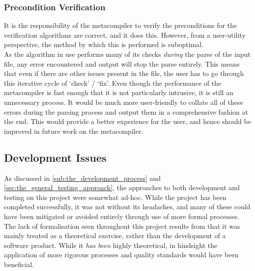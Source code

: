 
\subsubsection{Precondition Verification} %
\label{ssub:precondition_verification}
It is the responsibility of the metacompiler to verify the preconditions for the verification algorithms are correct, and it does this.
However, from a user-utility perspective, the method by which this is performed is suboptimal.\\

As the algorithm in use performs many of its checks \textit{during} the parse of the input file, any error encountered and output will stop the parse entirely.
This means that even if there are other issues present in the file, the user has to go through this iterative cycle of `check' / `fix'.
Even though the performance of the metacompiler is fast enough that it is not particularly intrusive, it is still an unnecessary process. 
It would be much more user-friendly to collate all of these errors during the parsing process and output them in a comprehensive fashion at the end.
This would provide a better experience for the user, and hence should be improved in future work on the metacompiler. 



\subsection{Development Issues} %
\label{sub:development_issues}
As discussed in \autoref{sub:the_development_process} and \autoref{sec:the_general_testing_approach}, the approaches to both development and testing on this project were somewhat ad-hoc. 
While the project has been completed successfully, it was not without its headaches, and many of these could have been mitigated or avoided entirely through use of more formal processes.
The lack of formalisation seen throughout this project results from that it was mainly treated as a theoretical exercise, rather than the development of a software product.
While it \textit{has been} highly theoretical, in hindsight the application of more rigorous processes and quality standards would have been beneficial.\\

